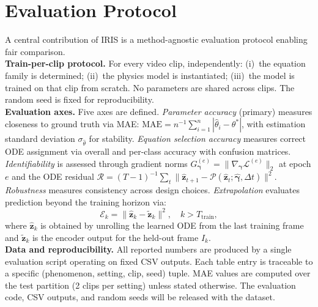 \documentclass[runningheads]{llncs}
\begin{document}
\section{Evaluation Protocol}
\label{sec:eval_protocol}

A central contribution of IRIS is a method-agnostic evaluation protocol enabling fair comparison.\\
\noindent
\textbf{Train-per-clip protocol.} For every video clip, independently: (i)~the equation family is determined; (ii)~the physics model is instantiated; (iii)~the model is trained on that clip from scratch. No parameters are shared across clips. The random seed is fixed for reproducibility.
\\
\noindent
\textbf{Evaluation axes.} Five axes are defined. \emph{Parameter accuracy} (primary) measures closeness to ground truth via MAE:
$\mathrm{MAE} = n^{-1} \sum_{i=1}^{n} |\hat{\theta}_i - \theta^*|$,
with estimation standard deviation $\sigma_{\hat{\theta}}$ for stability. \emph{Equation selection accuracy} measures correct ODE assignment via overall and per-class accuracy with confusion matrices. \emph{Identifiability} is assessed through gradient norms $G_{\boldsymbol{\gamma}}^{(e)} = \|\nabla_{\boldsymbol{\gamma}}\mathcal{L}^{(e)}\|_2$ at epoch $e$ and the ODE residual $\mathcal{R} = (T{-}1)^{-1}\sum_t \|\hat{\mathbf{z}}_{t+1} - \mathcal{P}(\hat{\mathbf{z}}_t; \hat{\boldsymbol{\gamma}}, \Delta t)\|^2$. \emph{Robustness} measures consistency across design choices. \emph{Extrapolation} evaluates prediction beyond the training horizon via:
\begin{equation}
    \mathcal{E}_k = \|\hat{\mathbf{z}}_k - \tilde{\mathbf{z}}_k\|^2, \quad k > T_{\mathrm{train}},
    \label{eq:extrapolation}
\end{equation}
where $\hat{\mathbf{z}}_k$ is obtained by unrolling the learned ODE from the last training frame and $\tilde{\mathbf{z}}_k$ is the encoder output for the held-out frame $I_k$.
\\
\noindent
\textbf{Data and reproducibility.} All reported numbers are produced by a single evaluation script operating on fixed CSV outputs. Each table entry is traceable to a specific (phenomenon, setting, clip, seed) tuple. MAE values are computed over the test partition (2 clips per setting) unless stated otherwise. The evaluation code, CSV outputs, and random seeds will be released with the dataset.
\end{document}
